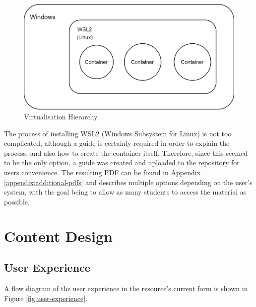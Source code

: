 \begin{figure}[h]
\centering
\includegraphics[scale=0.17]{./images/misc/virtualisation}
\caption{Virtualisation Hierarchy} \label{fig:virtualisation}
\end{figure}

The process of installing WSL2 (Windows Subsystem for Linux) is not too complicated, although a guide is certainly required in order to explain the process, and also how to create the container itself. Therefore, since this seemed to be the only option, a guide was created and uploaded to the repository for users convenience. The resulting PDF can be found in Appendix \ref{appendix:additional-pdfs} and describes multiple options depending on the user's system, with the goal being to allow as many students to access the material as possible.



\section{Content Design} \label{section:content-design}



\subsection{User Experience} \label{subsection:user-experience}

A flow diagram of the user experience in the resource's current form is shown in Figure \ref{fig:user-experience}.

